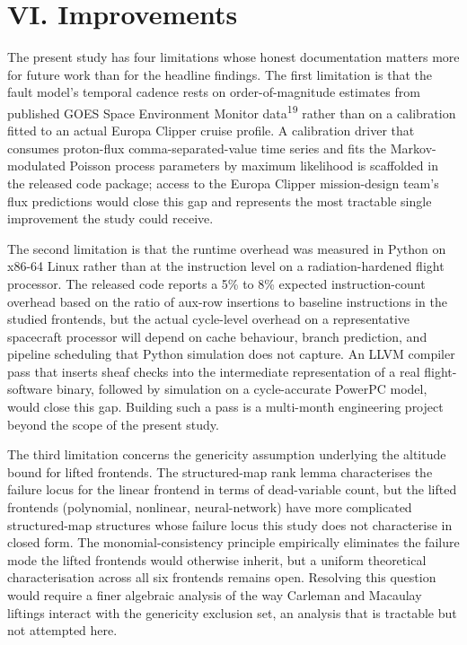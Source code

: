 \documentclass[12pt,a4paper]{article}
\theoremstyle{plain}
\theoremstyle{definition}
\begin{document}
\section{VI. Improvements}

The present study has four limitations whose honest documentation matters more for future work than for the headline findings. The first limitation is that the fault model's temporal cadence rests on order-of-magnitude estimates from published GOES Space Environment Monitor data\textsuperscript{19} rather than on a calibration fitted to an actual Europa Clipper cruise profile. A calibration driver that consumes proton-flux comma-separated-value time series and fits the Markov-modulated Poisson process parameters by maximum likelihood is scaffolded in the released code package; access to the Europa Clipper mission-design team's flux predictions would close this gap and represents the most tractable single improvement the study could receive.

The second limitation is that the runtime overhead was measured in Python on x86-64 Linux rather than at the instruction level on a radiation-hardened flight processor. The released code reports a 5\% to 8\% expected instruction-count overhead based on the ratio of aux-row insertions to baseline instructions in the studied frontends, but the actual cycle-level overhead on a representative spacecraft processor will depend on cache behaviour, branch prediction, and pipeline scheduling that Python simulation does not capture. An LLVM compiler pass that inserts sheaf checks into the intermediate representation of a real flight-software binary, followed by simulation on a cycle-accurate PowerPC model, would close this gap. Building such a pass is a multi-month engineering project beyond the scope of the present study.

The third limitation concerns the genericity assumption underlying the altitude bound for lifted frontends. The structured-map rank lemma characterises the failure locus for the linear frontend in terms of dead-variable count, but the lifted frontends (polynomial, nonlinear, neural-network) have more complicated structured-map structures whose failure locus this study does not characterise in closed form. The monomial-consistency principle empirically eliminates the failure mode the lifted frontends would otherwise inherit, but a uniform theoretical characterisation across all six frontends remains open. Resolving this question would require a finer algebraic analysis of the way Carleman and Macaulay liftings interact with the genericity exclusion set, an analysis that is tractable but not attempted here.
\end{document}
